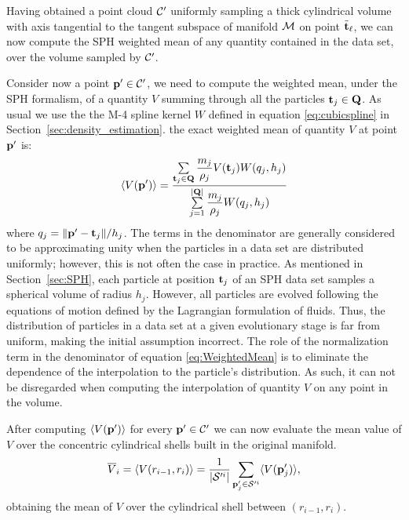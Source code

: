 Having obtained a point cloud $\mathcal{C}'$ uniformly sampling a thick cylindrical volume with axis tangential to the tangent subspace of manifold $\mathcal{M}$ on point $\tilde{\boldsymbol{\mathbf{t}}}_\ell$,
we can now compute the SPH weighted mean of any quantity contained in the data set, over the volume sampled by $\mathcal{C}'$.

Consider now a point $\boldsymbol{\mathbf{p}}' \in \mathcal{C}'$, we need to compute the weighted mean, under the SPH formalism, of a quantity $V$ summing through all the particles $\boldsymbol{\mathbf{t}}_j \in \boldsymbol{\mathbf{Q}}$.
As usual we use the the M-4 spline kernel $W$ defined in equation \eqref{eq:cubicspline} in Section~\ref{sec:density_estimation}.
the exact weighted mean of quantity $V$ at point $\boldsymbol{\mathbf{p}}'$ is:
\begin{equation}\label{eq:WeightedMean}
  \langle V(\boldsymbol{\mathbf{p}}') \rangle = \dfrac{\sum\limits_{\boldsymbol{\mathbf{t}}_j \in \boldsymbol{\mathbf{Q}}} \dfrac{m_j}{\rho_j} V(\boldsymbol{\mathbf{t}}_j) W(q_j,h_j)}{\sum\limits_{j=1}^{|\boldsymbol{\mathbf{Q}}|} \dfrac{m_j}{\rho_j} W(q_j,h_j)}
\end{equation}
where $q_j = \norm{\boldsymbol{\mathbf{p}}' - \boldsymbol{\mathbf{t}}_j}/h_j$.
The terms in the denominator are generally considered to be approximating unity when the particles in a data set are distributed uniformly; however, this is not often the case in practice.
As mentioned in Section~\ref{sec:SPH}, each particle at position $\boldsymbol{\mathbf{t}}_j$ of an SPH data set samples a spherical volume of radius $h_j$.
However, all particles are evolved following the equations of motion defined by the Lagrangian formulation of fluids.
Thus, the distribution of particles in a data set at a given evolutionary stage is far from uniform, making the initial assumption incorrect.
The role of the normalization term
in the denominator of equation \ref{eq:WeightedMean} is to eliminate the dependence of the interpolation to the particle's distribution.
As such, it can not be disregarded when computing the interpolation of quantity $V$ on any point in the volume.

After computing $\langle V(\boldsymbol{\mathbf{p}}')\rangle$ for every $\boldsymbol{\mathbf{p}}' \in \mathcal{C}'$ we can now evaluate the mean value of $V$ over the concentric cylindrical shells built in the original manifold.%
\begin{equation}
  \overline{V}_{i} = \langle V(r_{i-1},r_i)\rangle = \frac{1}{|\mathcal{S}'^i|} \sum_{\boldsymbol{\mathbf{p}}'_j \in \mathcal{S}'^i} \langle V(\boldsymbol{\mathbf{p}}'_j)\rangle,
\end{equation}
obtaining the mean of $V$ over the cylindrical shell between $(r_{i-1},r_i)$.

